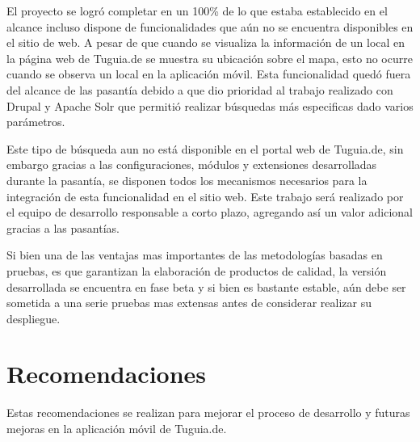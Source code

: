 El proyecto se logró completar en un 100\% de lo que estaba establecido en el alcance incluso dispone de funcionalidades que aún no se encuentra disponibles en el sitio de web. A pesar de que cuando se visualiza la información de un local en la página web de Tuguia.de se muestra su ubicación sobre el mapa, esto no ocurre cuando se observa un local en la aplicación móvil. Esta funcionalidad quedó fuera del alcance de las pasantía debido a que dio prioridad al trabajo realizado con Drupal y Apache Solr que permitió realizar búsquedas más especificas dado varios parámetros. 

Este tipo de búsqueda aun no está disponible en el portal web de Tuguia.de, sin embargo gracias a las configuraciones, módulos y extensiones desarrolladas durante la pasantía, se disponen todos los mecanismos necesarios para la integración de esta funcionalidad en el sitio web. Este trabajo será realizado por el equipo de desarrollo responsable a corto plazo, agregando así un valor adicional gracias a las pasantías.


Si bien una de las ventajas mas importantes de las metodologías basadas en pruebas, es que garantizan la elaboración de productos de calidad, la versión desarrollada se encuentra en fase beta y si bien es bastante estable, aún debe ser sometida a una serie pruebas mas extensas antes de considerar realizar su despliegue.

\section{Recomendaciones}

Estas recomendaciones se realizan para mejorar el proceso de desarrollo y futuras mejoras en la aplicación móvil de Tuguia.de. 

